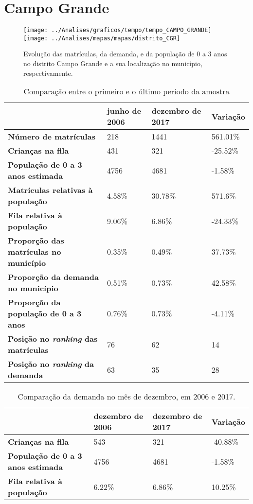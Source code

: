 \section{Campo Grande}
\begin{figure}[H]
	\centering
	\texttt{[image: ../Analises/graficos/tempo/tempo\_CAMPO\_GRANDE]}
	\texttt{[image: ../Analises/mapas/mapas/distrito\_CGR]}
	\caption{Evolução das matrículas, da demanda, e da população de 0 a 3 anos no distrito Campo Grande e a sua localização no município, respectivamente.}
\end{figure}
\begin{table}[H]
	\begin{tabular}{|l|l|l|l|}
		\hline
		\textbf{}                                      & \textbf{junho de 2006}       & \textbf{dezembro de 2017}    & \textbf{Variação} \\ \hline
		\textbf{Número de matrículas}                  & 218 & 1441 & 561.01\% \\ \hline
		\textbf{Crianças na fila}                      & 431 & 321 & -25.52\% \\ \hline
		\textbf{População de 0 a 3 anos estimada}      & 4756 & 4681 & -1.58\% \\ \hline
		\textbf{Matrículas relativas à população}      & 4.58\% & 30.78\% & 571.6\% \\ \hline
		\textbf{Fila relativa à população}             & 9.06\% & 6.86\% & -24.33\% \\ \hline
		\textbf{Proporção das matrículas no município} & 0.35\% & 0.49\% & 37.73\% \\ \hline
		\textbf{Proporção da demanda no município}     & 0.51\% & 0.73\% & 42.58\% \\ \hline
		\textbf{Proporção da população de 0 a 3 anos}  & 0.76\% & 0.73\% & -4.11\% \\ \hline
		\textbf{Posição no \textit{ranking} das matrículas}     & 76 & 62 & 14 \\ \hline
		\textbf{Posição no \textit{ranking} da demanda}         & 63 & 35 & 28 \\ \hline
	\end{tabular}
	\caption{Comparação entre o primeiro e o último período da amostra}
\end{table}
\begin{table}[H]
	\begin{tabular}{|l|l|l|l|}
		\hline
		\textbf{}                                 & \textbf{dezembro de 2006} & \textbf{dezembro de 2017} & \textbf{Variação} \\ \hline
		\textbf{Crianças na fila}                      & 543 & 321 & -40.88\% \\ \hline
		\textbf{População de 0 a 3 anos estimada}      & 4756 & 4681 & -1.58\% \\ \hline
		\textbf{Fila relativa à população}             & 6.22\% & 6.86\% & 10.25\% \\ \hline
	\end{tabular}
	\caption{Comparação da demanda no mês de dezembro, em 2006 e 2017.}
\end{table}
